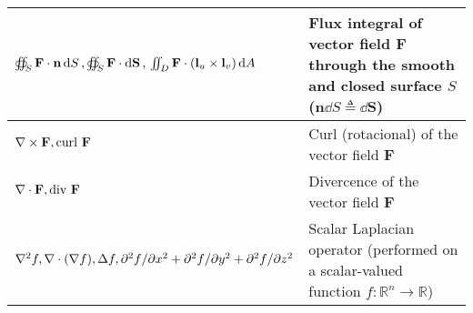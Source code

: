 \begin{xltabular}{\textwidth}{XX}
	\(\oiint_S \mathbf{F}\cdot \mathbf{n} \dd{S}, \oiint_S \mathbf{F} \cdot \dd{\mathbf{S}}, \newline \iint_D \mathbf{F} \cdot (\mathbf{l}_u\times\mathbf{l}_v) \dd{A}\)                                                                                                                               & Flux integral of vector field \(\mathbf{F}\) through the smooth and closed surface \(S\) (\(\mathbf{n} \dd{S} \triangleq \dd{\mathbf{S}}\))                                                                                                                                                                                         \\ \hline
	\(\nabla \times \mathbf{F} , \textnormal{curl } \mathbf{F}\)                                                                                                                                                                                                                                       & Curl (rotacional) of the vector field \(\mathbf{F}\)                                                                                                                                                                                                                                                                                \\ \hline
	\(\nabla \cdot \mathbf{F} , \textnormal{div } \mathbf{F}\)                                                                                                                                                                                                                                         & Divercence of the vector field \(\mathbf{F}\)                                                                                                                                                                                                                                                                                       \\ \hline
	\(\nabla^2 f, \nabla \cdot (\nabla f), \Delta f, \newline \partial^2f/\partial x^2 + \partial^2f/\partial y^2 + \partial^2f/\partial z^2\)                                                                                                                                                         & Scalar Laplacian operator (performed on a scalar-valued function \(f: \mathbb{R}^{n} \rightarrow \mathbb{R}\))                                                                                                                                                                                                                      \\ \hline

\end{xltabular}
